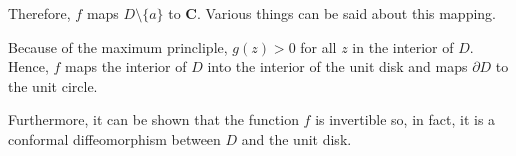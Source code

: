 \documentclass[12pt]{article}
\begin{document}
Therefore, $f$ maps $D \setminus \{a\}$ to $\mathbf{C}$.  Various things can be said about this mapping.

Because of the maximum princliple, $g(z) > 0$ for all $z$ in the interior of $D$.  Hence, $f$ maps the interior of $D$ into the interior of the unit disk and maps $\partial D$ to the unit circle.

Furthermore, it can be shown that the function $f$ is invertible so, in fact, it  is a conformal diffeomorphism between $D$ and the unit disk.
\end{document}
